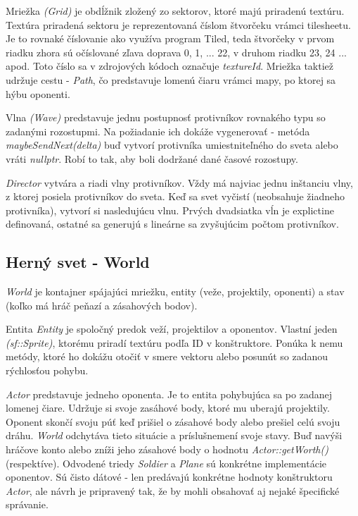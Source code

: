 \documentclass[12pt]{article}
\begin{document}
Mriežka \emph{(Grid)} je obdĺžnik zložený zo sektorov, ktoré majú priradenú textúru. Textúra priradená sektoru je 
reprezentovaná číslom štvorčeku vrámci tilesheetu. Je to rovnaké číslovanie ako využíva program Tiled, teda štvorčeky
v prvom riadku zhora sú očíslované zľava doprava 0, 1, ... 22, v druhom riadku 23, 24 ... apod. Toto číslo sa v zdrojových
kódoch označuje \emph{textureId}. Mriežka taktiež udržuje cestu - \emph{Path},
čo predstavuje lomenú čiaru vrámci mapy, po ktorej sa hýbu oponenti.


Vlna \emph{(Wave)} predstavuje jednu postupnosť protivníkov rovnakého typu so zadanými rozostupmi.
Na požiadanie ich dokáže vygenerovať - metóda \emph{maybeSendNext(delta)} buď vytvorí protivníka umiestniteľného do sveta
alebo vráti \emph{nullptr}. Robí to tak, aby boli dodržané dané časové rozostupy.


\emph{Director} vytvára a riadi vlny protivníkov. Vždy má najviac jednu inštanciu vlny, z ktorej posiela protivníkov do sveta.
Keď sa svet vyčistí (neobsahuje žiadneho protivníka), vytvorí si nasledujúcu vlnu. Prvých dvadsiatka vĺn je explictine definovaná,
ostatné sa generujú s lineárne sa zvyšujúcim počtom protivníkov.

\subsection{Herný svet - World}

\emph{World} je kontajner spájajúci mriežku, entity (veže, projektily, oponenti) a stav (koľko má hráč peňazí a zásahových bodov).


Entita \emph{Entity} je spoločný predok veží, projektilov a oponentov. Vlastní jeden \emph{(sf::Sprite)}, ktorému
priradí textúru podľa ID v konštruktore. Ponúka k nemu metódy, ktoré ho dokážu otočiť v smere vektoru alebo posunút so zadanou
rýchlosťou pohybu.


\emph{Actor} predstavuje jedneho oponenta. Je to entita pohybujúca sa po zadanej lomenej čiare. Udržuje si svoje zasáhové body, ktoré
mu uberajú projektily. Oponent skončí svoju púť keď prišiel o zásahové body alebo prešiel celú svoju dráhu. \emph{World} odchytáva tieto
situácie a príslušnemení svoje stavy. Buď navýši hráčove konto alebo zníži jeho zásahové body o hodnotu \emph{Actor::getWorth()} (respektíve).
Odvodené triedy \emph{Soldier} a \emph{Plane} sú konkrétne implementácie oponentov. Sú čisto dátové - len predávajú konkrétne hodnoty 
konštruktoru \emph{Actor}, ale návrh je pripravený tak, že by mohli obsahovať aj nejaké špecifické správanie.
\end{document}
